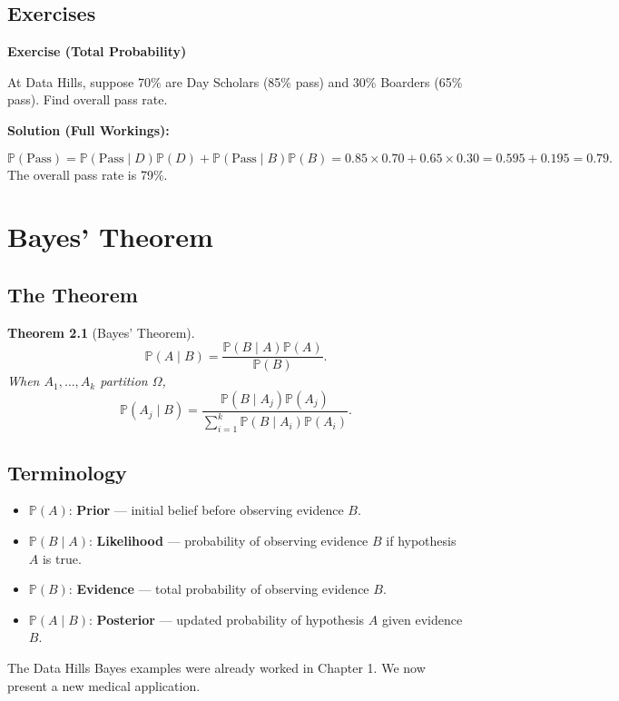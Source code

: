 \documentclass[12pt,a4paper,oneside]{report}
\theoremstyle{mytheorem}
\newtheorem{theorem}{Theorem}[chapter]
\theoremstyle{mydefinition}
\theoremstyle{myremark}
\newenvironment{exercise}[1]{%
  \par\medskip\noindent\textbf{\color{myblue}Exercise (#1)}\par\smallskip
}{%
  \par\smallskip
}
\newenvironment{solution}{%
  \par\noindent\textbf{\color{mygreen}Solution (Full Workings):}\par\smallskip
}{%
  \par\bigskip
}
\newcommand{\Prob}{\mathbb{P}}
\begin{document}
\section{Exercises}
\begin{exercise}{Total Probability}
At Data Hills, suppose 70\% are Day Scholars (85\% pass) and 30\% Boarders (65\% pass). Find overall pass rate.
\end{exercise}
\begin{solution}
\[
\Prob(\text{Pass}) = \Prob(\text{Pass} \mid D)\Prob(D) + \Prob(\text{Pass} \mid B)\Prob(B)
= 0.85 \times 0.70 + 0.65 \times 0.30 = 0.595 + 0.195 = 0.79.
\]
The overall pass rate is 79\%.
\end{solution}

\chapter{Bayes' Theorem}

\section{The Theorem}
\begin{theorem}[Bayes' Theorem]
\[
\Prob(A \mid B) = \frac{\Prob(B \mid A) \Prob(A)}{\Prob(B)}.
\]
When $A_1, \dots, A_k$ partition $\Omega$,
\[
\Prob(A_j \mid B) = \frac{\Prob(B \mid A_j) \Prob(A_j)}{\sum_{i=1}^k \Prob(B \mid A_i) \Prob(A_i)}.
\]
\end{theorem}

\section{Terminology}
\begin{itemize}
    \item $\Prob(A)$: \textbf{Prior} — initial belief before observing evidence $B$.
    \item $\Prob(B \mid A)$: \textbf{Likelihood} — probability of observing evidence $B$ if hypothesis $A$ is true.
    \item $\Prob(B)$: \textbf{Evidence} — total probability of observing evidence $B$.
    \item $\Prob(A \mid B)$: \textbf{Posterior} — updated probability of hypothesis $A$ given evidence $B$.
\end{itemize}

The Data Hills Bayes examples were already worked in Chapter 1. We now present a new medical application.
\end{document}
